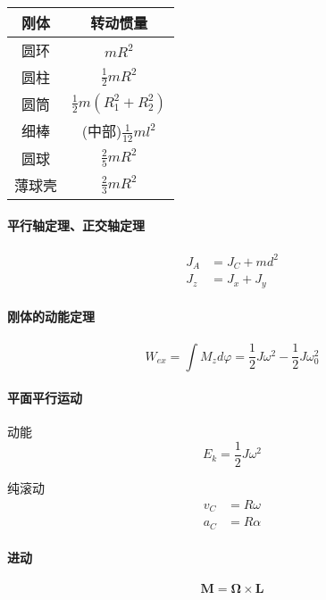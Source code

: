 \documentclass[12pt,a4paper]{article}
\numberwithin{equation}{section}
\begin{document}
\begin{CJK}{UTF8}{gbsn}
\begin{center}
  \begin{tabular}{cc}
  \hline
  刚体 & 转动惯量 \\
  \hline
  圆环 & $mR^2$ \\
  圆柱 & $\frac{1}{2}mR^2$ \\
  圆筒 & $\frac{1}{2}m(R_1^2+R_2^2)$ \\
  细棒 & (中部)$\frac{1}{12}ml^2$ \\
  圆球 & $\frac{2}{5}mR^2$ \\
  薄球壳 & $\frac{2}{3}mR^2$ \\
  \hline
\end{tabular}
\end{center}

\paragraph{平行轴定理、正交轴定理}
\begin{align}
  J_A &= J_C+md^2 \\
  J_z &= J_x+J_y
\end{align}

\paragraph{刚体的动能定理}
\begin{equation}
  W_{ex}=\int M_zd\varphi=\frac{1}{2}J\omega^2-\frac{1}{2}J\omega_0^2
\end{equation}

\paragraph{平面平行运动\\}
动能
\begin{equation}
  E_k=\frac{1}{2}J\omega^2
\end{equation}

纯滚动
\begin{align}
  v_C &=R\omega \\
  a_C &=R\alpha
\end{align}

\paragraph{进动}
\begin{equation}
  \bm{M}=\bm{\Omega}\times\bm{L}
\end{equation}


\end{CJK}
\end{document}

